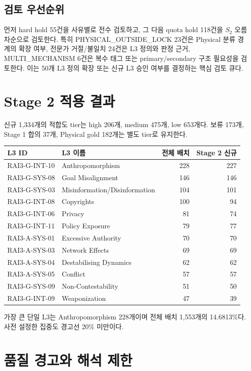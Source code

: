 \documentclass[11pt,a4paper]{article}
\begin{document}
\subsection{검토 우선순위}

먼저 hard hold 55건을 사유별로 전수 검토하고, 그 다음 quota hold 118건을
$S_2$ 오름차순으로 검토한다. 특히 PHYSICAL\_OUTSIDE\_LOCK 23건은 Physical
분류 경계의 확장 여부, 전문가 거절/불일치 24건은 L3 정의와 판정 근거,
MULTI\_MECHANISM 6건은 복수 태그 또는 primary/secondary 구조 필요성을 검토한다.
이는 50개 L3 정의 확장 또는 신규 L3 승인 여부를 결정하는 핵심 검토 큐다.

\section{Stage 2 적용 결과}

신규 1,334개의 적합도 tier는 high 206개, medium 475개, low 653개다.
보류 173개, Stage 1 합의 37개, Physical gold 182개는 별도 tier로 유지한다.

\begin{longtable}{llrr}
\toprule
L3 ID & L3 이름 & 전체 배치 & Stage 2 신규 \\
\midrule
\endhead
RAI3-G-INT-10 & Anthropomorphism & 228 & 227 \\
RAI3-G-SYS-08 & Goal Misalignment & 146 & 146 \\
RAI3-G-SYS-03 & Misinformation/Disinformation & 104 & 101 \\
RAI3-G-INT-08 & Copyrights & 100 & 94 \\
RAI3-G-INT-06 & Privacy & 81 & 74 \\
RAI3-G-INT-11 & Policy Exposure & 79 & 77 \\
RAI3-A-SYS-01 & Excessive Authority & 70 & 70 \\
RAI3-A-SYS-03 & Network Effects & 69 & 69 \\
RAI3-A-SYS-04 & Destabilising Dynamics & 62 & 62 \\
RAI3-A-SYS-05 & Conflict & 57 & 57 \\
RAI3-G-SYS-09 & Non-Contestability & 51 & 50 \\
RAI3-G-INT-09 & Weaponization & 47 & 39 \\
\bottomrule
\end{longtable}

가장 큰 단일 L3는 Anthropomorphism 228개이며 전체 배치 1,553개의 14.6813\%다.
사전 설정한 집중도 경고선 20\% 미만이다.

\section{품질 경고와 해석 제한}
\end{document}
